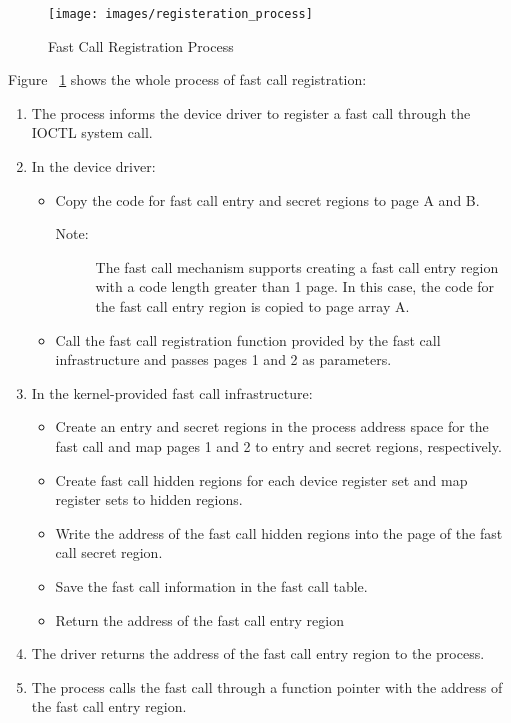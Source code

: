 \begin{figure}[tbp]
  \centering
  \texttt{[image: images/registeration\_process]}
  \caption[Short description]{Fast Call Registration Process}
  \label{fig:registeration_process}
\end{figure}

Figure ~\ref{fig:registeration_process} shows the whole process of fast call registration:
\begin{enumerate}
  \item The process informs the device driver to register a fast call through the IOCTL system call.
  \item In the device driver:
    \begin{itemize}
      \item Copy the code for fast call entry and secret regions to page A and B.
        \begin{description}
          \item[Note:] The fast call mechanism supports creating a fast call entry region with a code length greater than 1 page. In this case, the code for the fast call entry region is copied to page array A.
        \end{description}
      \item Call the fast call registration function provided by the fast call infrastructure and passes pages 1 and 2 as parameters.
    \end{itemize}
  \item In the kernel-provided fast call infrastructure:
    \begin{itemize}
      \item Create an entry and secret regions in the process address space for the fast call and map pages 1 and 2 to entry and secret regions, respectively.
      \item Create fast call hidden regions for each device register set and map register sets to hidden regions.
      \item Write the address of the fast call hidden regions into the page of the fast call secret region.
      \item Save the fast call information in the fast call table.
      \item Return the address of the fast call entry region
    \end{itemize}
  \item The driver returns the address of the fast call entry region to the process.
  \item The process calls the fast call through a function pointer with the address of the fast call entry region.
\end{enumerate}


